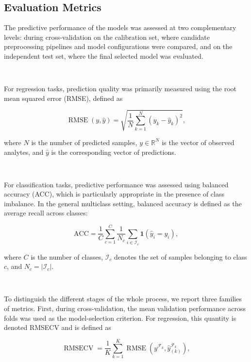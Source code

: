 \documentclass{article}
\begin{document}
\FloatBarrier
\subsection{Evaluation Metrics}

The predictive performance of the models was assessed at two complementary levels: during cross-validation on the calibration set, where candidate preprocessing pipelines and model configurations were compared, and on the independent test set, where the final selected model was evaluated.

~

For regression tasks, prediction quality was primarily measured using the root mean squared error (RMSE), defined as

\begin{equation}
\operatorname{RMSE}(y,\hat{y})
=
\sqrt{\frac{1}{N}\sum_{k=1}^{N}(y_k-\hat{y}_k)^2},
\end{equation}

where $N$ is the number of predicted samples, $y \in \mathbb{R}^N$ is the vector of observed analytes, and $\hat{y}$ is the corresponding vector of predictions.

~

For classification tasks, predictive performance was assessed using balanced accuracy (ACC), which is particularly appropriate in the presence of class imbalance. In the general multiclass setting, balanced accuracy is defined as the average recall across classes:

\begin{equation}
\mathrm{ACC}
=
\frac{1}{C}
\sum_{c=1}^{C}
\frac{1}{N_c}
\sum_{i \in \mathcal{I}_c}
\mathbf{1}\!\left(\hat{y}_i = y_i\right),
\end{equation}

where $C$ is the number of classes, $\mathcal{I}_c$ denotes the set of samples belonging to class $c$, and $N_c = |\mathcal{I}_c|$.

~

To distinguish the different stages of the whole process, we report three families of metrics. First, during cross-validation, the mean validation performance across folds was used as the model-selection criterion. For regression, this quantity is denoted RMSECV and is defined as

\begin{equation}
\operatorname{RMSECV}
=
\frac{1}{K}\sum_{k=1}^{K}
\operatorname{RMSE}\!\left(
y^{\mathcal{F}_k},
\hat{y}^{\mathcal{F}_k}_{(k)}
\right),
\end{equation}
\end{document}
